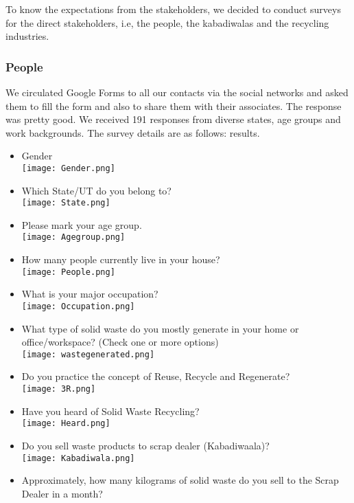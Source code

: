 \documentclass{article}
\begin{document}
\par To know the expectations from the stakeholders, we decided to conduct surveys for the direct stakeholders, i.e, the people, the kabadiwalas and the recycling industries.

\subsubsection{People}
\par  We circulated Google Forms to all our contacts via the social networks and asked them to fill the form and also to share them with their associates. The response was pretty good. We received 191 responses from diverse states, age groups and work backgrounds. The survey details are as follows:
 results.
\begin{itemize}
    \item Gender\\
    \texttt{[image: Gender.png]}
    \item Which State/UT do you belong to?\\
    \texttt{[image: State.png]}
    \item Please mark your age group.\\
    \texttt{[image: Agegroup.png]}
    \newpage
    \item How many people currently live in your house?\\
    \texttt{[image: People.png]}
    \item What is your major occupation?\\
    \texttt{[image: Occupation.png]}
    \item What type of solid waste do you mostly generate in your home or office/workspace? (Check one or more options)\\
    \texttt{[image: wastegenerated.png]}
    \item Do you practice the concept of Reuse, Recycle and Regenerate?\\
    \texttt{[image: 3R.png]}
    \item Have you heard of Solid Waste Recycling?\\
    \texttt{[image: Heard.png]}
    \item Do you sell waste products to scrap dealer (Kabadiwaala)?\\
    \texttt{[image: Kabadiwala.png]}
    \newpage
    \item Approximately, how many kilograms of solid waste do you sell to the Scrap Dealer in a month?\\

\end{itemize}
\end{document}
